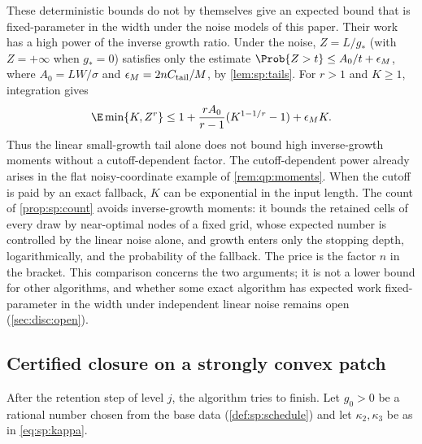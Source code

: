 These deterministic bounds do not by themselves give an expected bound that
is fixed-parameter in the width under the noise models of this paper.
Their work has a high power of the inverse growth ratio. Under the noise,
$Z=L/g_*$ (with $Z=+\infty$ when $g_*=0$) satisfies only the estimate
$\Prob\{Z>t\}\le A_0/t+\epsilon_M$, where
$A_0=LW/\sigma$ and $\epsilon_M=2nC_{\rm tail}/M$, by
\cref{lem:sp:tails}. For $r>1$ and $K\ge1$, integration gives
\[
 \E\min\{K,Z^r\}\le
 1+\frac{rA_0}{r-1}(K^{1-1/r}-1)+\epsilon_M K.
\]
Thus the linear small-growth tail alone does not bound high inverse-growth
moments without a cutoff-dependent factor. The cutoff-dependent power
already arises in the flat noisy-coordinate example of
\cref{rem:qp:moments}. When the cutoff is paid by an exact fallback, $K$ can be
exponential in the input length. The count of \cref{prop:sp:count} avoids
inverse-growth moments: it bounds the retained cells of every draw by
near-optimal nodes of a fixed grid, whose expected number is controlled by
the linear noise alone, and growth enters only the stopping depth,
logarithmically, and the probability of the fallback. The price is the
factor $n$ in the bracket. This comparison concerns the two arguments; it
is not a lower bound for other algorithms, and whether some exact algorithm
has expected work fixed-parameter in the width under independent linear
noise remains open (\cref{sec:disc:open}).

\subsection{Certified closure on a strongly convex patch}\label{sec:sp:closure}

After the retention step of level $j$, the algorithm tries to finish. Let
$g_0>0$ be a rational number chosen from the base data (\cref{def:sp:schedule})
and let $\kappa_2,\kappa_3$ be as in \eqref{eq:sp:kappa}.


